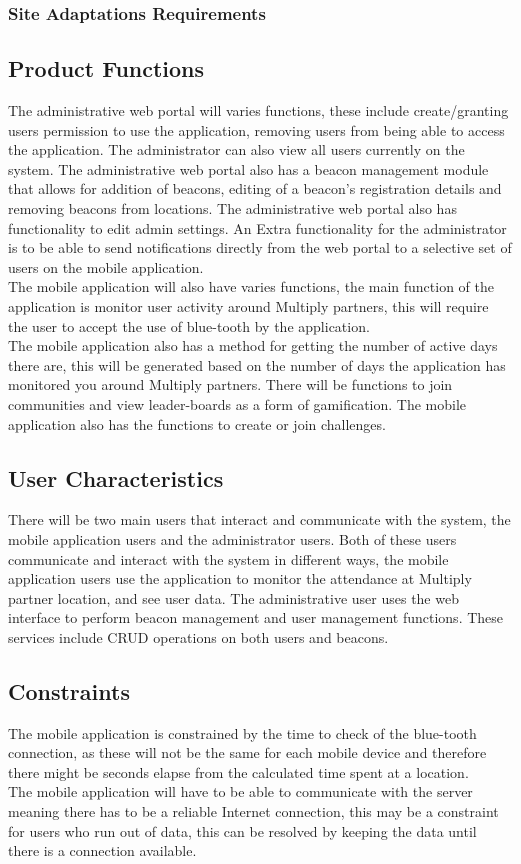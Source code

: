 \documentclass[11pt]{article}
\begin{document}
\subsubsection{Site Adaptations Requirements}

\subsection{Product Functions}
The administrative web portal will varies functions, these include create/granting users permission to use the application, removing users from being able to access the application. The administrator can also view all users currently on the system. The administrative web portal also has a beacon management module that allows for addition of beacons, editing of a beacon's registration details and removing beacons from locations.  The administrative web portal also has functionality to edit admin settings. An Extra functionality for the administrator is to be able to send notifications directly from the web portal to a selective set of users on the mobile application. \\
The mobile application will also have varies functions, the main function of the application is monitor user activity around Multiply partners, this will require the user to accept the use of blue-tooth by the application. \\  
The mobile application also has a method for getting the number of active days there are, this will be generated based on the number of days the application has monitored you around Multiply partners.  There will be functions to join communities and view leader-boards as a form of gamification. The mobile application also has the functions to create or join challenges.  
\subsection{User Characteristics}
There will be two main users that interact and communicate with the system, the mobile application users and the administrator users. Both of these users communicate and interact with the system in different ways, the mobile application users use the application to monitor the attendance at Multiply partner location, and see user data. The administrative user uses the web interface to perform beacon management and user management functions. These services include CRUD operations on both users and beacons.
   
\subsection{Constraints}
The mobile application is constrained by the time to check of the blue-tooth connection, as these will not be the same for each mobile device and therefore there might be seconds elapse from the calculated time spent at a location.\\
The mobile application will have to be able to communicate with the server meaning there has to be a reliable Internet connection, this may be a constraint for  users who run out of data, this can be resolved by keeping the data until there is a connection available.\\
\end{document}

